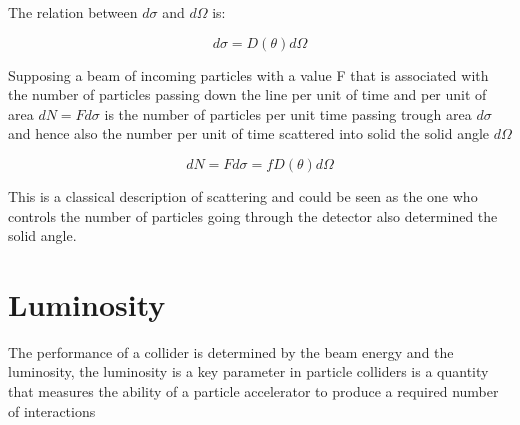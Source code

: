 The relation between $d\sigma$ and $d\Omega$ is:

\begin{equation}
d\sigma = D(\theta)d\Omega
\end{equation}

Supposing a beam of incoming particles with a value F that is associated with the number of particles passing down the line per unit of time and per unit of area $dN = F d\sigma $ is the number of particles per unit time passing trough area $d\sigma$ and hence also the number per unit of time scattered into solid the solid angle $d\Omega$

\begin{equation}
dN = F d\sigma = fD(\theta) d\Omega 
\end{equation}

This is a classical description of scattering and could be seen as the one who controls the number of particles going through the detector also determined the solid angle. 




\section{Luminosity}

The performance of a collider is determined by the beam energy and the luminosity, the luminosity is a key parameter in particle colliders is a quantity that measures the ability of a particle accelerator to produce a required number of interactions\cite{Lum} 

